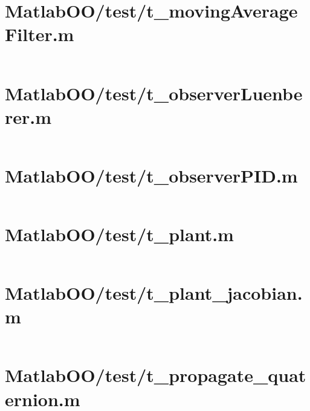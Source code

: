 \pagebreak
\section*{MatlabOO/test/t\_movingAverageFilter.m}\label{code:MatlabOO/test/t_movingAverageFilter.m}
\inputminted[linenos,fontsize=\scriptsize]{matlab}{/home/dcouture/git/mathyourlife/TSatPy/beta_versions/matlab_object_oriented/test/t_movingAverageFilter.m}

\pagebreak
\section*{MatlabOO/test/t\_observerLuenberer.m}\label{code:MatlabOO/test/t_observerLuenberer.m}
\inputminted[linenos,fontsize=\scriptsize]{matlab}{/home/dcouture/git/mathyourlife/TSatPy/beta_versions/matlab_object_oriented/test/t_observerLuenberer.m}

\pagebreak
\section*{MatlabOO/test/t\_observerPID.m}\label{code:MatlabOO/test/t_observerPID.m}
\inputminted[linenos,fontsize=\scriptsize]{matlab}{/home/dcouture/git/mathyourlife/TSatPy/beta_versions/matlab_object_oriented/test/t_observerPID.m}

\pagebreak
\section*{MatlabOO/test/t\_plant.m}\label{code:MatlabOO/test/t_plant.m}
\inputminted[linenos,fontsize=\scriptsize]{matlab}{/home/dcouture/git/mathyourlife/TSatPy/beta_versions/matlab_object_oriented/test/t_plant.m}

\pagebreak
\section*{MatlabOO/test/t\_plant\_jacobian.m}\label{code:MatlabOO/test/t_plant_jacobian.m}
\inputminted[linenos,fontsize=\scriptsize]{matlab}{/home/dcouture/git/mathyourlife/TSatPy/beta_versions/matlab_object_oriented/test/t_plant_jacobian.m}

\pagebreak
\section*{MatlabOO/test/t\_propagate\_quaternion.m}\label{code:MatlabOO/test/t_propagate_quaternion.m}
\inputminted[linenos,fontsize=\scriptsize]{matlab}{/home/dcouture/git/mathyourlife/TSatPy/beta_versions/matlab_object_oriented/test/t_propagate_quaternion.m}

